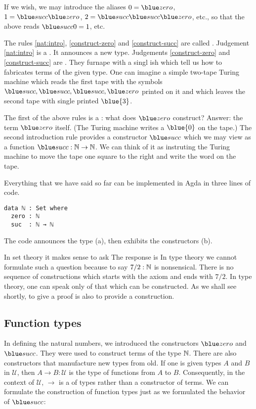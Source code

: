 If we wish, we may introduce the aliases $0 = \zero$, $1 = \suc \zero$, $2 = \suc \suc \zero$, etc., so that the above reads $\suc 0 = 1$, etc.  

The rules \eqref{nat:intro}, \eqref{construct-zero} and \eqref{construct-succ} are called . Judgement \eqref{nat:intro} is a .  It announces a new type. Judgements \eqref{construct-zero} and \eqref{construct-succ} are .  They furnape with a singl ish  which tell us how to fabricates terms of the given type.  One can imagine a simple two-tape Turing machine which reads the first tape with the symbols $\suc, \suc, \suc, \zero$ printed on it and which leaves the second tape with single printed $\blue{3}$.

The first of the above rules is a : what does $\zero$ construct?  Answer: the term $\zero$ itself.  (The Turing machine writes a $\blue{0}$ on the tape.) The second introduction rule provides a constructor $\suc$ which we may view as a function $\suc : \bbN \to \bbN$.  We can think of it as instruting the Turing machine to move the tape one square to the right and write the word  on the tape.

Everything that we have said so far can be implemented in Agda in three lines of code.

\begin{verbatim}
data ℕ : Set where
  zero : ℕ
  suc  : ℕ → ℕ
\end{verbatim}

The code announces the type (a), then exhibits the constructors (b).  


In set theory it makes sense to ask   The response is  In type theory we cannot formulate such a question because to say  $7/2 : \mathbb{N}$ is nonsensical. There is no sequence of constructions which starts with the axiom and ends with $7/2$.  In type theory, one can speak only of that which can be constructed.  As we shall see shortly, to give a proof is also to provide a construction.

\subsection{Function types}

In defining the natural numbers, we introduced the constructors $\zero$ and $\suc$.  They were used to construct terms of the type $\mathbb{N}$.  There are also constructors that manufacture new types from old.  If one is given types $A$ and $B$ in $\mathcal{U}$, then $A \to B: \mathcal{U}$ is the type of functions from $A$ to $B$.  Consequently, in the context of $\mathcal{U}$, $\to$ is a  of types rather than a constructor of terms.  We can formulate the construction of function types just as we formulated the behavior of $\suc$:

